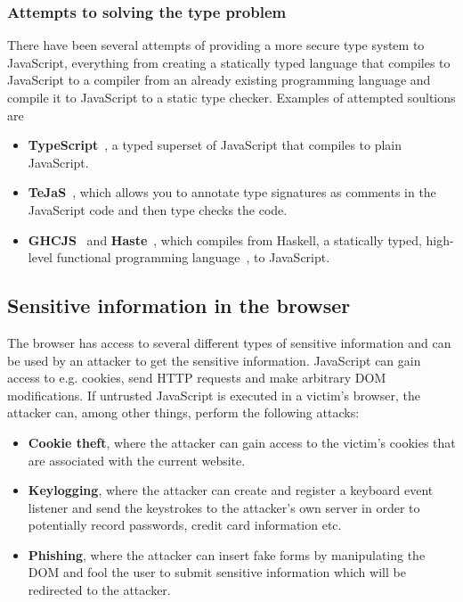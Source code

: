 \subsubsection{Attempts to solving the type problem}
There have been several attempts of providing a more secure type system to JavaScript, everything from creating a statically typed language that compiles to JavaScript to a compiler from an already existing programming language and compile it to JavaScript to a static type checker. Examples of attempted soultions are
\begin{itemize}
  \item \textbf{TypeScript}~\cite{typescript}, a typed superset of JavaScript that compiles to plain JavaScript.
  \item \textbf{TeJaS}~\cite{tejas-art,tejas-git}, which allows you to annotate type signatures as comments in the JavaScript code and then type checks the code.
  \item \textbf{GHCJS}~\cite{ghcjs} and \textbf{Haste}~\cite{haste-lang,haste-symposium}, which compiles from Haskell, a statically typed, high-level functional programming language~\cite{haskell}, to JavaScript.
\end{itemize}

\subsection{Sensitive information in the browser}
The browser has access to several different types of sensitive information and can be used by an attacker to get the sensitive information. JavaScript can gain access to e.g. cookies, send HTTP requests and make arbitrary DOM modifications. If untrusted JavaScript is executed in a victim's browser, the attacker can, among other things, perform the following attacks:
\begin{itemize}
  \item \textbf{Cookie theft}, where the attacker can gain access to the victim's cookies that are associated with the current website.
  \item \textbf{Keylogging}, where the attacker can create and register a keyboard event listener and send the keystrokes to the attacker's own server in order to potentially record passwords, credit card information etc.
  \item \textbf{Phishing}, where the attacker can insert fake forms by manipulating the DOM and fool the user to submit sensitive information which will be redirected to the attacker.
\end{itemize}
